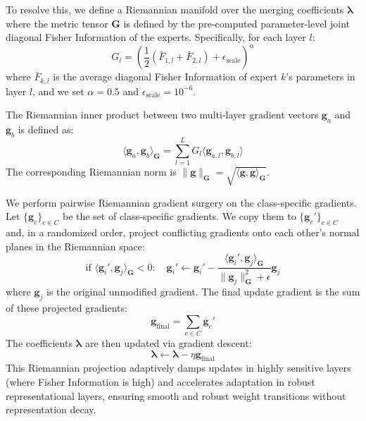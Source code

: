 \documentclass{article}
\theoremstyle{plain}
\theoremstyle{definition}
\theoremstyle{remark}
\begin{document}
To resolve this, we define a Riemannian manifold over the merging coefficients $\boldsymbol{\lambda}$ where the metric tensor $\mathbf{G}$ is defined by the pre-computed parameter-level joint diagonal Fisher Information of the experts. Specifically, for each layer $l$:
\begin{equation}
    G_l = \left( \frac{1}{2} (\bar{F}_{1,l} + \bar{F}_{2,l}) + \epsilon_{\text{scale}} \right)^{\alpha}
\end{equation}
where $\bar{F}_{k,l}$ is the average diagonal Fisher Information of expert $k$'s parameters in layer $l$, and we set $\alpha = 0.5$ and $\epsilon_{\text{scale}} = 10^{-6}$.

The Riemannian inner product between two multi-layer gradient vectors $\mathbf{g}_a$ and $\mathbf{g}_b$ is defined as:
\begin{equation}
    \langle \mathbf{g}_a, \mathbf{g}_b \rangle_{\mathbf{G}} = \sum_{l=1}^L G_l \langle \mathbf{g}_{a,l}, \mathbf{g}_{b,l} \rangle
\end{equation}
The corresponding Riemannian norm is $\|\mathbf{g}\|_{\mathbf{G}} = \sqrt{\langle \mathbf{g}, \mathbf{g} \rangle_{\mathbf{G}}}$.

We perform pairwise Riemannian gradient surgery on the class-specific gradients. Let $\{\mathbf{g}_c\}_{c \in C}$ be the set of class-specific gradients. We copy them to $\{\mathbf{g}_c'\}_{c \in C}$ and, in a randomized order, project conflicting gradients onto each other's normal planes in the Riemannian space:
\begin{equation}
    \text{if } \langle \mathbf{g}_i', \mathbf{g}_j \rangle_{\mathbf{G}} < 0: \quad \mathbf{g}_i' \leftarrow \mathbf{g}_i' - \frac{\langle \mathbf{g}_i', \mathbf{g}_j \rangle_{\mathbf{G}}}{\|\mathbf{g}_j\|_{\mathbf{G}}^2 + \epsilon} \mathbf{g}_j
\end{equation}
where $\mathbf{g}_j$ is the original unmodified gradient. The final update gradient is the sum of these projected gradients:
\begin{equation}
    \mathbf{g}_{\text{final}} = \sum_{c \in C} \mathbf{g}_c'
\end{equation}
The coefficients $\boldsymbol{\lambda}$ are then updated via gradient descent:
\begin{equation}
    \boldsymbol{\lambda} \leftarrow \boldsymbol{\lambda} - \eta \mathbf{g}_{\text{final}}
\end{equation}
This Riemannian projection adaptively damps updates in highly sensitive layers (where Fisher Information is high) and accelerates adaptation in robust representational layers, ensuring smooth and robust weight transitions without representation decay.
\end{document}
